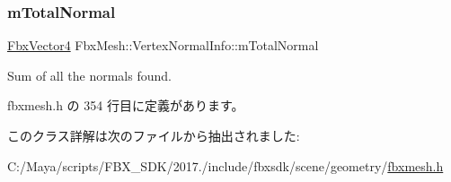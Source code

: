 \subsubsection{\texorpdfstring{m\+Total\+Normal}{mTotalNormal}}
{\footnotesize\ttfamily \hyperlink{class_fbx_vector4}{Fbx\+Vector4} Fbx\+Mesh\+::\+Vertex\+Normal\+Info\+::m\+Total\+Normal}



Sum of all the normals found. 



 fbxmesh.\+h の 354 行目に定義があります。



このクラス詳解は次のファイルから抽出されました\+:\begin{DoxyCompactItemize}
\item 
C\+:/\+Maya/scripts/\+F\+B\+X\+\_\+\+S\+D\+K/2017./include/fbxsdk/scene/geometry/\hyperlink{fbxmesh_8h}{fbxmesh.\+h}\end{DoxyCompactItemize}
